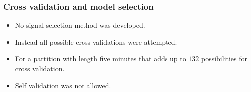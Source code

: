 \begin{frame}
	\frametitle{Cross validation and model selection}
		\begin{itemize}
			\item<1-> No signal selection method was developed.
			\item<2-> Instead all possible cross validations were attempted.
			\item<3-> For a partition with length five minutes that adds up to $132$ possibilities for cross validation.
			\item<4-> Self validation was not allowed.
		\end{itemize}
\end{frame}
